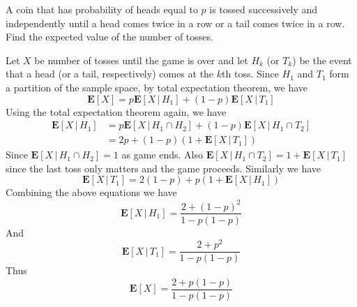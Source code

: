 \documentclass{tufte-handout}
\theoremstyle{definition} \newtheorem{definition}{Definition}
\theoremstyle{definition} \newtheorem{remark}{Remark}
\newcommand{\expt}[1]{\mathbf{E} \left[ #1 \right]}
\newcommand{\cexpt}[2]{\mathbf{E} \left[ #1 \, | \, #2 \right]}
\begin{document}
\begin{example}
  A coin that has probability of heads equal to $p$ is tossed successively
  and independently until a head comes twice in a row or a tail comes
  twice in a row. Find the expected value of the number of tosses.
\end{example}

\begin{solution}
  Let $X$ be number of tosses until the game is over and let $H_k$
  (or $T_k$) be the event that a head (or a tail, respectively)
  comes at the $k$th toss. Since $H_1$ and $T_1$ form a partition of the
  sample space, by total expectation theorem, we have
  \begin{equation*}
    \expt{X} = p \cexpt{X}{H_1} + (1 - p) \cexpt{X}{T_1}
  \end{equation*}
  Using the total expectation theorem again, we have
  \begin{align*}
    \cexpt{X}{H_1} & = p \cexpt{X}{H_1 \cap H_2} +
                     (1 - p) \cexpt{X}{H_1 \cap T_2}\\
                   & = 2p + (1 - p) (1 + \cexpt{X}{T_1})
  \end{align*}
  Since $\cexpt{X}{H_1 \cap H_2} = 1$ as game ends. Also
  $\cexpt{X}{H_1 \cap T_2} = 1 + \cexpt{X}{T_1}$ since the last toss only
  matters and the game proceeds. Similarly we have
  \begin{equation*}
    \cexpt{X}{T_1} = 2(1 - p) + p (1 + \cexpt{X}{H_1})
  \end{equation*}
  Combining the above equations we have
  \begin{equation*}
    \cexpt{X}{H_1} = \frac{2 + {(1 - p)}^2}{1 - p(1 - p)}
  \end{equation*}
  And
  \begin{equation*}
    \cexpt{X}{T_1} = \frac{2 + p^2}{1 - p(1 - p)}
  \end{equation*}
  Thus
  \begin{equation*}
    \expt{X} = \frac{2 + p(1 - p)}{1 - p(1 - p)}
  \end{equation*}
\end{solution}
\end{document}
